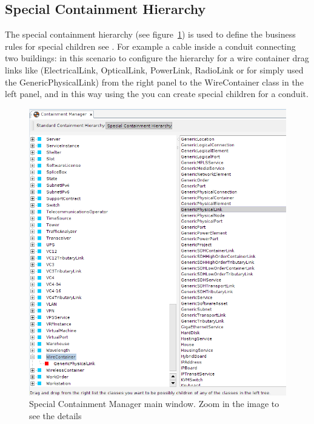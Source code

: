 \documentclass[a4paper]{article}
\begin{document}
	\subsection{Special Containment Hierarchy} \label{sec:special_containment_hierarchy}
	The special containment hierarchy (see figure~\ref{fig:special_containment_manager}) is used to define the business rules for special children see \textbf{}. For example a cable inside a conduit connecting two buildings: in this scenario to configure the hierarchy for a wire container drag links like (ElectricalLink, OpticalLink, PowerLink, RadioLink or for simply used the GenericPhysicalLink) from the right panel to the WireContainer class in the left panel, and in this way using the \textbf{} you can create special children for a conduit.
	
	\begin{figure}[h!]
		\centering
		\includegraphics[width=0.6\linewidth]{img/special_containment_manager.png}
		\caption{Special Containment Manager main window. Zoom in the image to see the details}
		\label{fig:special_containment_manager}
	\end{figure}
	
\end{document}
